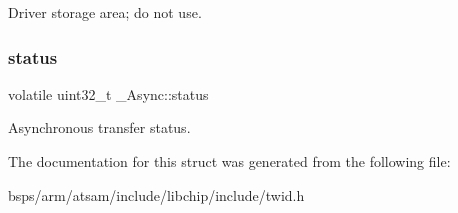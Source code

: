 Driver storage area; do not use. \mbox{\label{struct__Async_a1badababf6940f73d85c383b5a1422f2}} 
\subsubsection{\texorpdfstring{status}{status}}
{\footnotesize\ttfamily volatile uint32\+\_\+t \+\_\+\+Async\+::status}

Asynchronous transfer status. 

The documentation for this struct was generated from the following file\+:\begin{DoxyCompactItemize}
\item 
bsps/arm/atsam/include/libchip/include/twid.\+h\end{DoxyCompactItemize}
